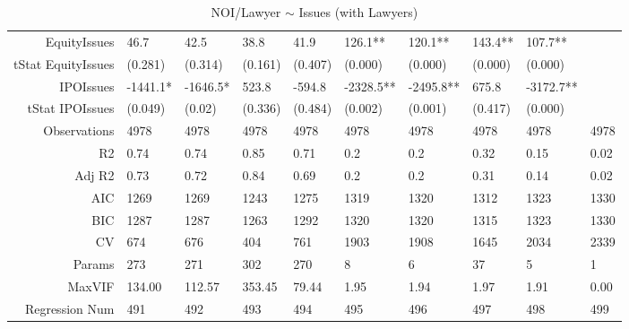 \begin{table}[ht]
\begin{tabular}{rlllllllll}
  EquityIssues & 46.7 & 42.5 & 38.8 & 41.9 & 126.1** & 120.1** & 143.4** & 107.7** &  \\ 
  tStat EquityIssues & (0.281) & (0.314) & (0.161) & (0.407) & (0.000) & (0.000) & (0.000) & (0.000) &  \\ 
  IPOIssues & -1441.1* & -1646.5* & 523.8 & -594.8 & -2328.5** & -2495.8** & 675.8 & -3172.7** &  \\ 
  tStat IPOIssues & (0.049) & (0.02) & (0.336) & (0.484) & (0.002) & (0.001) & (0.417) & (0.000) &  \\ 
  Observations & 4978 & 4978 & 4978 & 4978 & 4978 & 4978 & 4978 & 4978 & 4978 \\ 
  R2 & 0.74 & 0.74 & 0.85 & 0.71 & 0.2 & 0.2 & 0.32 & 0.15 & 0.02 \\ 
  Adj R2 & 0.73 & 0.72 & 0.84 & 0.69 & 0.2 & 0.2 & 0.31 & 0.14 & 0.02 \\ 
  AIC & 1269 & 1269 & 1243 & 1275 & 1319 & 1320 & 1312 & 1323 & 1330 \\ 
  BIC & 1287 & 1287 & 1263 & 1292 & 1320 & 1320 & 1315 & 1323 & 1330 \\ 
  CV & 674 & 676 & 404 & 761 & 1903 & 1908 & 1645 & 2034 & 2339 \\ 
  Params & 273 & 271 & 302 & 270 & 8 & 6 & 37 & 5 & 1 \\ 
  MaxVIF & 134.00 & 112.57 & 353.45 & 79.44 & 1.95 & 1.94 & 1.97 & 1.91 & 0.00 \\ 
  Regression Num & 491 & 492 & 493 & 494 & 495 & 496 & 497 & 498 & 499 \\ 
   \hline
\end{tabular}
\caption{NOI/Lawyer $\sim$ Issues (with Lawyers)} 
\end{table}
